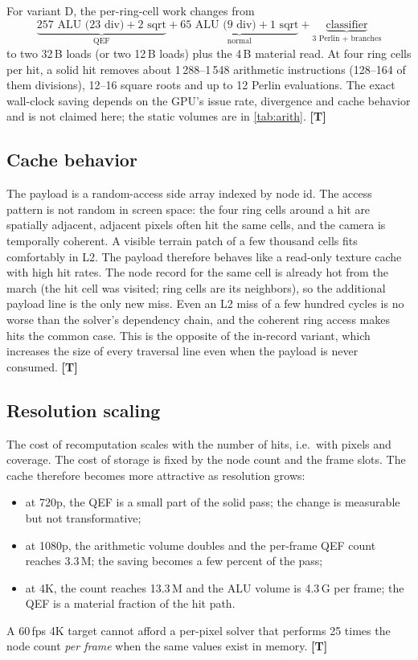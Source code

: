 \documentclass[11pt,a4paper]{article}
\newcommand{\evT}{\textsf{\textbf{\color{evT}[T]}}}
\theoremstyle{plain}
\theoremstyle{definition}
\theoremstyle{remark}
\begin{document}
For variant D, the per-ring-cell work changes from
\begin{equation}
\underbrace{257\text{ ALU (23 div)}+2\text{ sqrt}}_{\text{QEF}}
+\underbrace{65\text{ ALU (9 div)}+1\text{ sqrt}}_{\text{normal}}
+\underbrace{\text{classifier}}_{\text{3 Perlin + branches}}
\end{equation}
to two 32\,B loads (or two 12\,B loads) plus the 4\,B material read. At four
ring cells per hit, a solid hit removes about 1\,288--1\,548 arithmetic
instructions (128--164 of them divisions), 12--16 square roots and up to 12
Perlin evaluations. The exact
wall-clock saving depends on the GPU's issue rate, divergence and cache
behavior and is not claimed here; the static volumes are in
\cref{tab:arith}. \evT

\subsection{Cache behavior}

The payload is a random-access side array indexed by node id. The access
pattern is not random in screen space: the four ring cells around a hit are
spatially adjacent, adjacent pixels often hit the same cells, and the camera
is temporally coherent. A visible terrain patch of a few thousand cells fits
comfortably in L2. The payload therefore behaves like a read-only texture
cache with high hit rates. The node record for the same cell is already hot
from the march (the hit cell was visited; ring cells are its neighbors), so
the additional payload line is the only new miss. Even an L2 miss of a few
hundred cycles is no worse than the solver's dependency chain, and the coherent
ring access makes hits the common case. This is the opposite of the in-record
variant, which increases the size of every traversal line even when the
payload is never consumed. \evT

\subsection{Resolution scaling}

The cost of recomputation scales with the number of hits, i.e.\ with pixels
and coverage. The cost of storage is fixed by the node count and the frame
slots. The cache therefore becomes more attractive as resolution grows:
\begin{itemize}[leftmargin=1.3em,itemsep=1pt]
\item at 720p, the QEF is a small part of the solid pass; the change is
      measurable but not transformative;
\item at 1080p, the arithmetic volume doubles and the per-frame QEF count
      reaches 3.3\,M; the saving becomes a few percent of the pass;
\item at 4K, the count reaches 13.3\,M and the ALU volume is 4.3\,G per
      frame; the QEF is a material fraction of the hit path.
\end{itemize}
A 60\,fps 4K target cannot afford a per-pixel solver that performs 25 times
the node count \emph{per frame} when the same values exist in memory. \evT
\end{document}
